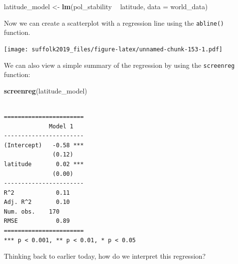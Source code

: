 \documentclass[]{article}
\newenvironment{Shaded}{\begin{snugshade}}{\end{snugshade}}
\newcommand{\DataTypeTok}[1]{\textcolor[rgb]{0.13,0.29,0.53}{#1}}
\newcommand{\DecValTok}[1]{\textcolor[rgb]{0.00,0.00,0.81}{#1}}
\newcommand{\KeywordTok}[1]{\textcolor[rgb]{0.13,0.29,0.53}{\textbf{#1}}}
\newcommand{\NormalTok}[1]{#1}
\newcommand{\OperatorTok}[1]{\textcolor[rgb]{0.81,0.36,0.00}{\textbf{#1}}}
\newcommand{\OtherTok}[1]{\textcolor[rgb]{0.56,0.35,0.01}{#1}}
\newcommand{\StringTok}[1]{\textcolor[rgb]{0.31,0.60,0.02}{#1}}
\begin{document}
\begin{Shaded}
\begin{Highlighting}[]
\NormalTok{latitude_model <-}\StringTok{ }\KeywordTok{lm}\NormalTok{(pol_stability }\OperatorTok{~}\StringTok{ }\NormalTok{latitude, }\DataTypeTok{data =}\NormalTok{ world_data)}
\end{Highlighting}
\end{Shaded}

Now we can create a scatterplot with a regression line using the \texttt{abline()} function.

\begin{Shaded}
\end{Shaded}

\texttt{[image: suffolk2019\_files/figure-latex/unnamed-chunk-153-1.pdf]}

We can also view a simple summary of the regression by using the \texttt{screenreg} function:

\begin{Shaded}
\begin{Highlighting}[]
\KeywordTok{screenreg}\NormalTok{(latitude_model)}
\end{Highlighting}
\end{Shaded}

\begin{verbatim}

=======================
             Model 1   
-----------------------
(Intercept)   -0.58 ***
              (0.12)   
latitude       0.02 ***
              (0.00)   
-----------------------
R^2            0.11    
Adj. R^2       0.10    
Num. obs.    170       
RMSE           0.89    
=======================
*** p < 0.001, ** p < 0.01, * p < 0.05
\end{verbatim}

Thinking back to earlier today, how do we interpret this regression?
\end{document}
